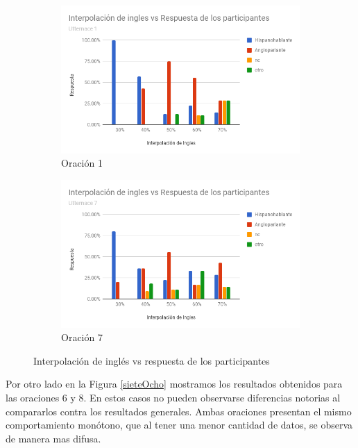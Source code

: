 \begin{figure}
\centering
\begin{subfigure}{.5\textwidth}
  \centering
	\includegraphics[trim={0 0 0 2.5cm},clip,width=1\textwidth]{imagenes/nacionalidades/1.png}
  \caption{Oración 1}
\end{subfigure}%
\begin{subfigure}{.5\textwidth}
  \centering
	\includegraphics[trim={0 0 0 2.5cm},clip,width=1\textwidth]{imagenes/nacionalidades/7.png}
  \caption{Oración 7}
\end{subfigure}
\caption{Interpolación de inglés vs respuesta de los participantes}
\label{unoSeis}
\end{figure}


Por otro lado en la Figura \ref{sieteOcho} mostramos los resultados obtenidos para las oraciones $6$ y $8$. En estos casos no pueden observarse diferencias notorias al compararlos contra los resultados generales. Ambas oraciones presentan el mismo comportamiento monótono, que al tener una menor cantidad de datos, se observa de manera mas difusa.


